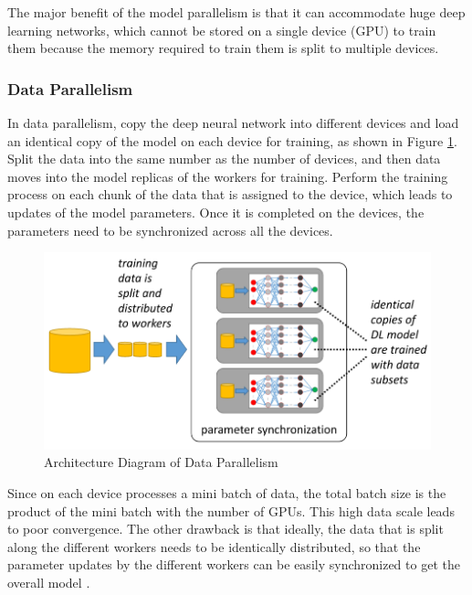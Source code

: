 The major benefit of the model parallelism is that it can accommodate huge deep learning networks, which cannot be stored on a single device (GPU) to train them because the memory required to train them is split to multiple devices. 

\subsubsection{Data Parallelism}
In data parallelism, copy the deep neural network into different devices and load an identical copy of the model on each device for training, as shown in Figure \ref{fig:dataparallel}. Split the data into the same number as the number of devices, and then data moves into the model replicas of the workers for training. Perform the training process on each chunk of the data that is assigned to the device, which leads to updates of the model parameters. Once it is completed on the devices, the parameters need to be synchronized across all the devices. 

\begin{figure}[ht]
  \begin{center}
    \includegraphics[width=\textwidth]{images/data parallelism.png} 
    \caption{Architecture Diagram of Data Parallelism  \cite{Mayer2020ScalableInfrastructures}}
    \label{fig:dataparallel}
  \end{center}
\end{figure}

Since on each device processes a mini batch of data, the total batch size is the product of the mini batch with the number of GPUs. This high data scale leads to poor convergence. The other drawback is that ideally, the data that is split along the different workers needs to be identically distributed, so that the parameter updates by the different workers can be easily synchronized to get the overall model \cite{Jia2018BeyondNetworks}.

